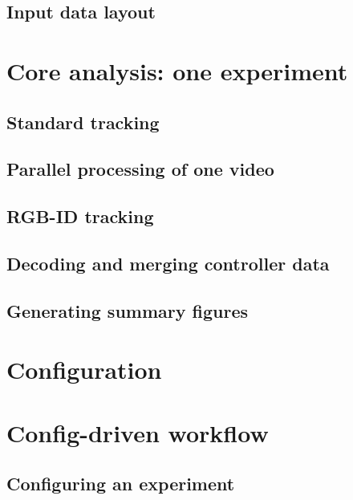 \documentclass[11pt,a4paper]{article}
\begin{document}
\subsection{Input data layout}

\section{Core analysis: one experiment}
\subsection{Standard tracking}

\subsection{Parallel processing of one video}

\subsection{RGB-ID tracking}

\subsection{Decoding and merging controller data}

\subsection{Generating summary figures}

\section{Configuration}

\section{Config-driven workflow}
\subsection{Configuring an experiment}
\end{document}
